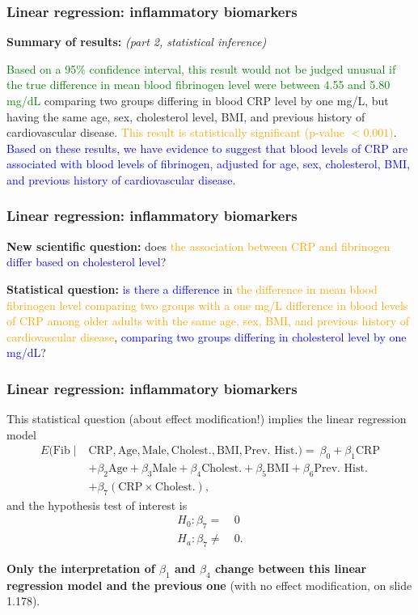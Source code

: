 \documentclass[12pt, 
hyperref={colorlinks=true, linkcolor=blue, urlcolor=cyan},dvipsnames]{beamer}
\begin{document}
\begin{frame}
\frametitle{Linear regression: inflammatory biomarkers}

\textbf{Summary of results:} \textit{(part 2, statistical inference)}

\textcolor{green}{Based on a 95\% confidence interval, this result would not be judged unusual if the true difference in mean blood fibrinogen level were between 4.55 and 5.80 mg/dL} comparing two groups differing in blood CRP level by one mg/L, but having the same age, sex, cholesterol level, BMI, and previous history of cardiovascular disease. \textcolor{orange}{This result is statistically significant (p-value $< 0.001$)}. \textcolor{blue}{Based on these results, we have evidence to suggest that blood levels of CRP are associated with blood levels of fibrinogen, adjusted for age, sex, cholesterol, BMI, and previous history of cardiovascular disease.}
\end{frame}

\begin{frame}
\frametitle{Linear regression: inflammatory biomarkers}
\textbf{New scientific question:} does \textcolor{orange}{the association between CRP and fibrinogen} \textcolor{blue}{differ based on cholesterol level}? 

\textbf{Statistical question:} \textcolor{blue}{is there a difference} in \textcolor{orange}{the difference in mean blood fibrinogen level comparing two groups with a one mg/L difference in blood levels of CRP among older adults with the same age, sex, BMI, and previous history of cardiovascular disease}, \textcolor{blue}{comparing two groups differing in cholesterol level by one mg/dL}?

\end{frame}

\begin{frame}
\frametitle{Linear regression: inflammatory biomarkers}
This statistical question (about effect modification!) implies the linear regression model
{\small 
\begin{align*}
E(\text{Fib} \mid & \text{CRP}, \text{Age}, \text{Male}, \text{Cholest.}, \text{BMI}, \text{Prev. Hist.}) =  \ \beta_0 + \beta_1 \text{CRP} \\
&+ \beta_2 \text{Age}  + \beta_3 \text{Male} + \beta_4 \text{Cholest.} + \beta_5 \text{BMI} + \beta_6 \text{Prev. Hist.} \\
&+ \beta_7 (\text{CRP} \times \text{Cholest.}),
\end{align*}
}
and the hypothesis test of interest is
\begin{align*}
H_0: \beta_7 = &\ 0 \\
H_a: \beta_7 \neq &\ 0.
\end{align*}

\textbf{Only the interpretation of $\beta_1$ and $\beta_4$ change between this linear regression model and the previous one} (with no effect modification, on slide 1.178).
\end{frame}
\end{document}
